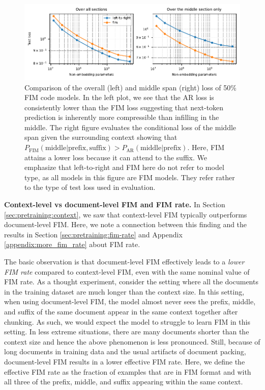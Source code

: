 \documentclass[postscript]{article}
\begin{document}
\begin{figure}[ht!]
\centering
\includegraphics[width=\textwidth]{figures/loss-comparison-ver3.pdf}
\caption{Comparison of the overall (left) and middle span (right) loss of 50\% FIM code models.
In the left plot, we see that the AR loss is consistently lower than the FIM loss suggesting that next-token prediction is inherently more compressible than infilling in the middle.
The right figure  evaluates the conditional loss of the middle span given the surrounding context showing that ~$P_{\text{FIM}}(\text{middle} |  \text{prefix}, \text{suffix}) >  P_{\text{AR}}(\text{middle} |  \text{prefix})$. Here, FIM attains a lower loss because it can attend to the suffix. We emphasize that  left-to-right and FIM here do not refer to model type, as all models in this figure are FIM models. They refer rather to the type of test loss used in evaluation.
}
\label{fig:fim-ar-loss}
\end{figure}




\textbf{Context-level vs document-level FIM and FIM rate.} In Section \ref{sec:pretraining:context}, we saw that context-level FIM typically outperforms document-level FIM. Here, we note a connection between this finding and the results in Section \ref{sec:pretraining:fim-rate} and Appendix \ref{appendix:more_fim_rate} about FIM rate.

The basic observation is that document-level FIM effectively leads to a \emph{lower FIM rate} compared to context-level FIM, even with the same nominal value of FIM rate. As a thought experiment, consider the setting where all the documents in the training dataset are much longer than the context size. In this setting, when using document-level FIM, the model almost never sees the prefix, middle, and suffix of the same document appear in the same context together after chunking. As such, we would expect the model to struggle to learn FIM in this setting. In less extreme situations,  there are many documents  shorter than the context size and hence the above phenomenon is less pronounced. Still, because of long documents in training data and the usual artifacts of document packing, document-level FIM results in a lower effective FIM rate. Here, we define the effective FIM rate as the fraction of examples that are in FIM format and with all three of the prefix, middle, and suffix appearing within the same context. 
\end{document}

